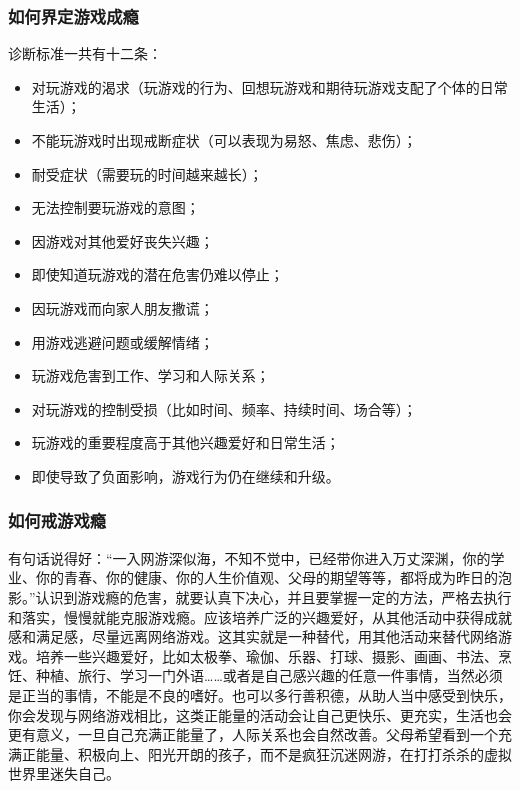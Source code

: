 \subsubsection{如何界定游戏成瘾}

诊断标准一共有十二条：

\begin{itemize}
    \item 对玩游戏的渴求（玩游戏的行为、回想玩游戏和期待玩游戏支配了个体的日常生活）；
    \item 不能玩游戏时出现戒断症状（可以表现为易怒、焦虑、悲伤）；
    \item 耐受症状（需要玩的时间越来越长）；
    \item 无法控制要玩游戏的意图；
    \item 因游戏对其他爱好丧失兴趣；
    \item 即使知道玩游戏的潜在危害仍难以停止；
    \item 因玩游戏而向家人朋友撒谎；
    \item 用游戏逃避问题或缓解情绪；
    \item 玩游戏危害到工作、学习和人际关系；
    \item 对玩游戏的控制受损（比如时间、频率、持续时间、场合等）；
    \item 玩游戏的重要程度高于其他兴趣爱好和日常生活；
    \item 即使导致了负面影响，游戏行为仍在继续和升级。
\end{itemize}

\subsubsection{如何戒游戏瘾}

有句话说得好：“一入网游深似海，不知不觉中，已经带你进入万丈深渊，你的学业、你的青春、你的健康、你的人生价值观、父母的期望等等，都将成为昨日的泡影。”认识到游戏瘾的危害，就要认真下决心，并且要掌握一定的方法，严格去执行和落实，慢慢就能克服游戏瘾。应该培养广泛的兴趣爱好，从其他活动中获得成就感和满足感，尽量远离网络游戏。这其实就是一种替代，用其他活动来替代网络游戏。培养一些兴趣爱好，比如太极拳、瑜伽、乐器、打球、摄影、画画、书法、烹饪、种植、旅行、学习一门外语……或者是自己感兴趣的任意一件事情，当然必须是正当的事情，不能是不良的嗜好。也可以多行善积德，从助人当中感受到快乐，你会发现与网络游戏相比，这类正能量的活动会让自己更快乐、更充实，生活也会更有意义，一旦自己充满正能量了，人际关系也会自然改善。父母希望看到一个充满正能量、积极向上、阳光开朗的孩子，而不是疯狂沉迷网游，在打打杀杀的虚拟世界里迷失自己。

